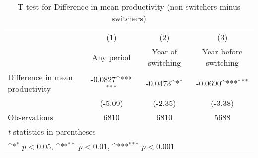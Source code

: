 \begin{table}[htbp]\centering
\def\sym#1{\ifmmode^{#1}\else\(^{#1}\)\fi}
\caption{T-test for Difference in mean productivity (non-switchers minus switchers)}
\begin{tabular}{l*{3}{c}}
\hline\hline
                    &\multicolumn{1}{c}{(1)}&\multicolumn{1}{c}{(2)}&\multicolumn{1}{c}{(3)}\\
                    &\multicolumn{1}{c}{Any period}&\multicolumn{1}{c}{Year of switching}&\multicolumn{1}{c}{Year before switching}\\
\hline
Difference in mean productivity&     -0.0827\sym{***}&     -0.0473\sym{*}  &     -0.0690\sym{***}\\
                    &     (-5.09)         &     (-2.35)         &     (-3.38)         \\
\hline
Observations        &        6810         &        6810         &        5688         \\
\hline\hline
\multicolumn{4}{l}{\footnotesize \textit{t} statistics in parentheses}\\
\multicolumn{4}{l}{\footnotesize \sym{*} \(p<0.05\), \sym{**} \(p<0.01\), \sym{***} \(p<0.001\)}\\
\end{tabular}
\end{table}
